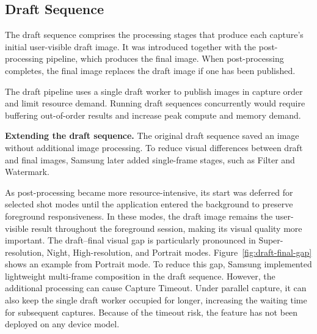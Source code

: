 \subsection{Draft Sequence}
\label{sec:draft-background}

The draft sequence comprises the processing stages that produce each capture's initial user-visible draft image.
It was introduced together with the post-processing pipeline, which produces the final image.
When post-processing completes, the final image replaces the draft image if one has been published.

The draft pipeline uses a single draft worker to publish images in capture order and limit resource demand.
Running draft sequences concurrently would require buffering out-of-order results and increase peak compute and memory demand.



\smallskip\noindent\textbf{Extending the draft sequence.}
The original draft sequence saved an image without additional image processing.
To reduce visual differences between draft and final images, Samsung later added single-frame stages, such as Filter and Watermark.

As post-processing became more resource-intensive, its start was deferred for selected shot modes until the application entered the background to preserve foreground responsiveness.
In these modes, the draft image remains the user-visible result throughout the foreground session, making its visual quality more important.
The draft--final visual gap is particularly pronounced in Super-resolution, Night, High-resolution, and Portrait modes.
Figure~\ref{fig:draft-final-gap} shows an example from Portrait mode.
To reduce this gap, Samsung implemented lightweight multi-frame composition in the draft sequence.
However, the additional processing can cause Capture Timeout. 
Under parallel capture, it can also keep the single draft worker occupied for longer, increasing the waiting time for subsequent captures.
Because of the timeout risk, the feature has not been deployed on any device model.
